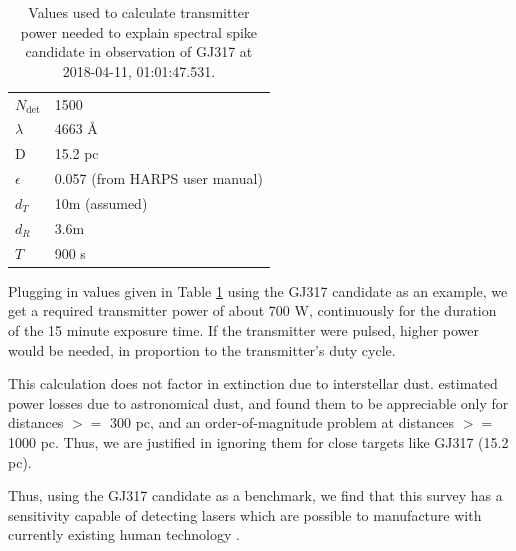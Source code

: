 \documentclass[twocolumn]{aastex701}
\begin{document}

\begin{table}[h]
\begin{tabular}{ll}
$N_{\mbox{det}}$ & 1500\\
$\lambda$ & 4663 \AA \\
D & 15.2 pc \\
$\epsilon$ & 0.057 (from HARPS user manual)\\
$d_T$ & 10m (assumed) \\
$d_R$ & 3.6m \\
$T$ & 900 s\\
\end{tabular}
\label{t:powervalues}
\caption{Values used to calculate transmitter power needed to explain spectral spike candidate in observation of GJ317 at 2018-04-11, 01:01:47.531.}
\end{table}

Plugging in values given in Table \ref{t:powervalues} using the GJ317 candidate as an example, we get a required transmitter power of about 700 W, continuously for the duration of the 15 minute exposure time. If the transmitter were pulsed, higher power would be needed, in proportion to the transmitter's duty cycle. 

This calculation does not factor in extinction due to interstellar dust.  \cite{Hippke_2018} estimated power losses due to astronomical dust, and found them to be appreciable only for distances $>=$ 300 pc, and an order-of-magnitude problem at distances $>=$ 1000 pc.  Thus, we are justified in ignoring them for close targets like GJ317 (15.2 pc).

Thus, using the GJ317 candidate as a benchmark, we find that this survey has a sensitivity capable of detecting lasers which are possible to manufacture with currently existing human technology \citep{Lander1997ContinuouswaveCD}.
\end{document}
